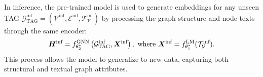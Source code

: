 In inference, the pre-trained model is used to generate embeddings for any unseen TAG \( \mathcal{G}^{\text{inf}}_{\text{TAG}} = (\mathcal{V}^{\text{inf}}, \mathcal{E}^{\text{inf}}, \mathcal{T}^{\text{inf}}_\mathcal{V})\) by processing the graph structure and node texts through the same encoder:
\begin{equation}
{\bm{H}}^{\text{inf}} = f_{\theta_2^*}^{\text{GNN}} \left( \mathcal{G}^{\text{inf}}_{\text{TAG}}, {\bm{X}}^{\text{inf}} \right), \text{ where } {\bm{X}}^{\text{inf}} = f_{\theta_1^*}^{\text{LM}}(\mathcal{T}^{\text{inf}}_\mathcal{V}).    
\end{equation}
This process allows the model to generalize to new data, capturing both structural and textual graph attributes.



